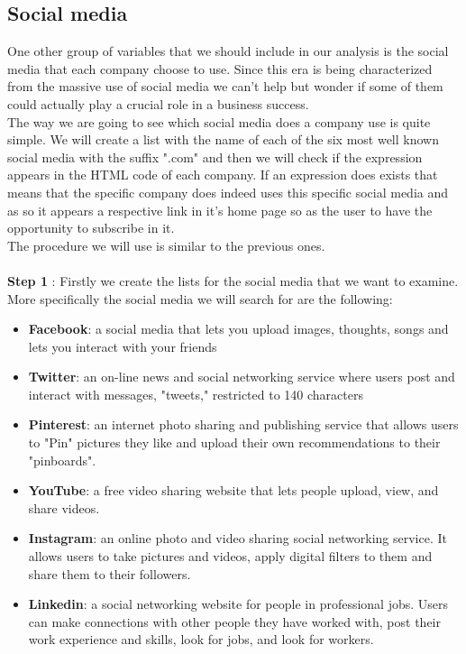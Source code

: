 \documentclass{book}
\begin{document}
\subsection{Social media}
One other group of variables that we should include in our analysis is the social media that each company choose to use. Since this era is being characterized from the massive use of social media we can't help but wonder if some of them could actually play a crucial role in a business success.\\
The way we are going to see which social media does a company use is quite simple. We will create a list with the name of each of the  six most well known social media with the suffix ".com" and then we will check if the expression appears in the HTML code of each company. If an expression does exists that means that the specific company does indeed uses this specific social media and as so it appears a respective link in it's home page so as the user to have the opportunity to subscribe in it.\\
The procedure we will use is similar to the previous ones.\\\\
\textbf{Step 1} : Firstly we create the lists for the social media that we want to examine. More specifically the social media we will search for are the following:
\begin{itemize}
\item\textbf{Facebook}: a social media that lets you upload images, thoughts, songs and lets you interact with your friends
\item\textbf{Twitter}: an on-line news and social networking service where users post and interact with messages, "tweets," restricted to 140 characters
\item\textbf{Pinterest}: an internet photo sharing and publishing service that allows users to "Pin" pictures they like and upload their own recommendations to their "pinboards".
\item\textbf{YouTube}: a free video sharing website that lets people upload, view, and share videos. 
\item\textbf{Instagram}: an online photo and video sharing social networking service. It allows users to take pictures and videos, apply digital filters to them and share them to their followers. 
\item\textbf{Linkedin}: a social networking website for people in professional jobs. Users can make connections with other people they have worked with, post their work experience and skills, look for jobs, and look for workers.
\end{itemize}
\end{document}
